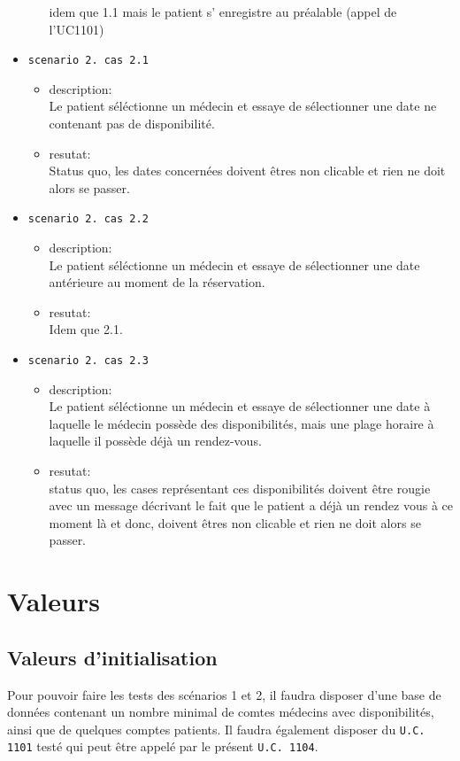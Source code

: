\documentclass[a4paper, 11pt]{report}
\begin{document}
\begin{itemize}
\begin{itemize}
					idem que 1.1 mais le patient s’ enregistre au préalable
					(appel de l’UC1101)\\
			\end{itemize}
		\item[] \texttt{scenario 2. cas 2.1}
			\begin{itemize}
				\item description:\\
					Le patient séléctionne un médecin et essaye de sélectionner
					une date ne contenant pas de disponibilité.
				\item resutat: \\
					Status quo, les dates concernées doivent êtres non clicable
					et rien ne doit alors se passer.\\
			\end{itemize}
		\item[] \texttt{scenario 2. cas 2.2}
			\begin{itemize}
				\item description:\\
					Le patient séléctionne un médecin et essaye de sélectionner
					une date antérieure au moment de la réservation.
				\item resutat: \\
					Idem que 2.1.\\
			\end{itemize}
		\item[] \texttt{scenario 2. cas 2.3}
			\begin{itemize}
				\item description:\\
					Le patient séléctionne un médecin et essaye de sélectionner
					une date à laquelle le médecin possède des disponibilités,
					mais une plage horaire à laquelle il possède déjà un
					rendez-vous.
				\item resutat: \\
					status quo, les cases représentant ces disponibilités
					doivent être rougie avec un message décrivant le fait que le
					patient a déjà un rendez vous à ce moment là et donc,
					doivent êtres non clicable et rien ne doit alors se passer.\\
			\end{itemize}
	\end{itemize}
	\newpage
	\section{Valeurs}
	\subsection{Valeurs d'initialisation}
	Pour pouvoir faire les tests des scénarios 1 et 2, il faudra disposer d’une
	base de données contenant un nombre minimal de comtes médecins avec
	disponibilités, ainsi que de quelques comptes patients.
	Il faudra également disposer du \texttt{U.C. 1101} testé qui peut être appelé par le
	présent \texttt{U.C. 1104}.
\end{document}
